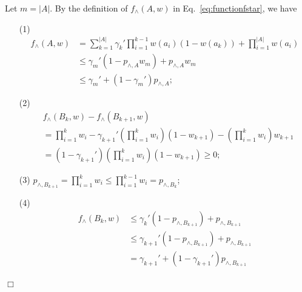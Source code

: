 \documentclass{article}
\newcommand{\abs}[1]{\left| #1 \right|}
\newenvironment{proof}{\noindent {\textbf{Proof. }}}{$\Box$ \medskip}
\begin{document}
\begin{proof}
  Let $m = |A|$.
  By the definition of $f_{\wedge}(A,w)$ in Eq.~\eqref{eq:functionfstar}, we have
  \begin{itemize}
  	\item[(1)]
  	\begin{align*}
  	  f_{\wedge}(A,w) & = \sum_{k = 1}^{\abs{A}} \gamma_k' \prod_{i = 1}^{k - 1} w(a_i) (1 - w(a_k)) + \prod_{i=1}^{\abs{A}}w(a_i) \\
  	  &\leq \gamma_m'(1 - p_{\wedge, A} w_m) + p_{\wedge, A} w_m \\
  	  &\leq \gamma_m' + (1 - \gamma_m') p_{\wedge, A};
  	\end{align*}
  	
  	\item[(2)]
  	\begin{align*}
  	  &f_{\wedge}(B_k, w) - f_{\wedge}(B_{k+1}, w)\\
  	  &=\prod_{i=1}^{k}w_i - \gamma_{k+1}' (\prod_{i=1}^{k}w_i) (1 - w_{k+1}) - (\prod_{i=1}^{k}w_i) w_{k+1}\\
  	  &=(1 - \gamma_{k+1}') (\prod_{i=1}^{k}w_i) (1 - w_{k+1}) \geq 0;
  	\end{align*}
  	
  	\item[(3)]
  	$p_{\wedge, B_{k+1}} = \prod_{i=1}^{k} w_i \leq \prod_{i=1}^{k-1} w_i = p_{\wedge, B_k}$;
  	
  	\item[(4)]
  	\begin{align*}
  	  f_{\wedge}(B_k, w) & \leq \gamma_{k}' (1 - p_{\wedge,B_{k+1}}) + p_{\wedge,B_{k+1}}\\
  	  &\leq \gamma_{k+1}' (1 - p_{\wedge,B_{k+1}}) + p_{\wedge,B_{k+1}} \\
  	  &= \gamma_{k+1}' + (1 - \gamma_{k+1}') p_{\wedge,B_{k+1}}
  	  \end{align*}
 \end{itemize}
\end{proof}
\end{document}
